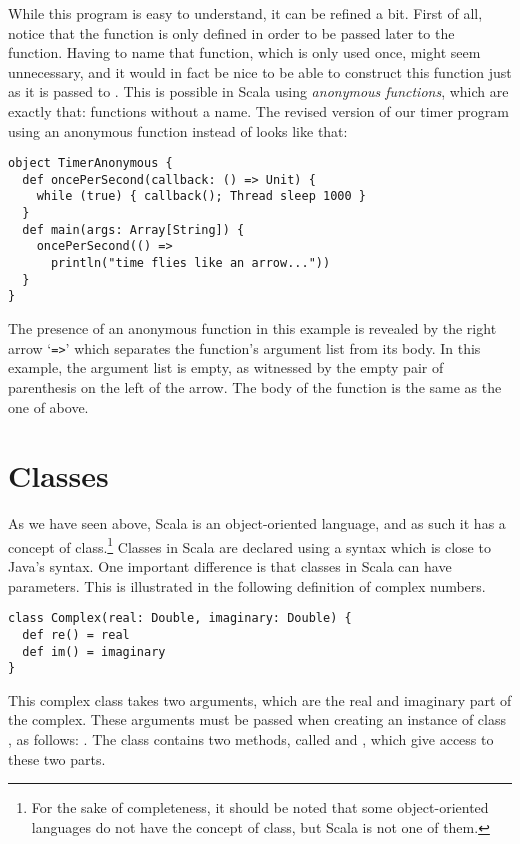 \documentclass[a4paper,12pt,twoside,titlepage]{article}
\newcommand{\langname}[1]{#1\xspace}
\newcommand{\Scala}{\langname{Scala}}
\newcommand{\Java}{\langname{Java}}
\begin{document}
While this program is easy to understand, it can be refined a bit.
First of all, notice that the function  is only
defined in order to be passed later to the 
function. Having to name that function, which is only used once, might
seem unnecessary, and it would in fact be nice to be able to construct
this function just as it is passed to . This is
possible in \Scala using \emph{anonymous functions}, which are exactly
that: functions without a name. The revised version of our timer
program using an anonymous function instead of  looks
like that:
\begin{lstlisting}
object TimerAnonymous {
  def oncePerSecond(callback: () => Unit) {
    while (true) { callback(); Thread sleep 1000 }
  }
  def main(args: Array[String]) {
    oncePerSecond(() =>
      println("time flies like an arrow..."))
  }
}
\end{lstlisting}
The presence of an anonymous function in this example is revealed by
the right arrow `\verb|=>|' which separates the function's argument
list from its body. In this example, the argument list is empty, as
witnessed by the empty pair of parenthesis on the left of the arrow.
The body of the function is the same as the one of 
above.


\section{Classes}
\label{sec:classes}

As we have seen above, \Scala is an object-oriented language, and as
such it has a concept of class.\footnote{For the sake of completeness,
  it should be noted that some object-oriented languages do not have
  the concept of class, but \Scala is not one of them.}
Classes in \Scala are declared using a syntax which is close to
\Java's syntax. One important difference is that classes in \Scala can
have parameters. This is illustrated in the following definition of
complex numbers.
\begin{lstlisting}
class Complex(real: Double, imaginary: Double) {
  def re() = real
  def im() = imaginary
}
\end{lstlisting}
This complex class takes two arguments, which are the real and
imaginary part of the complex. These arguments must be passed when
creating an instance of class , as follows: . The class contains two methods, called 
and , which give access to these two parts.
\end{document}
